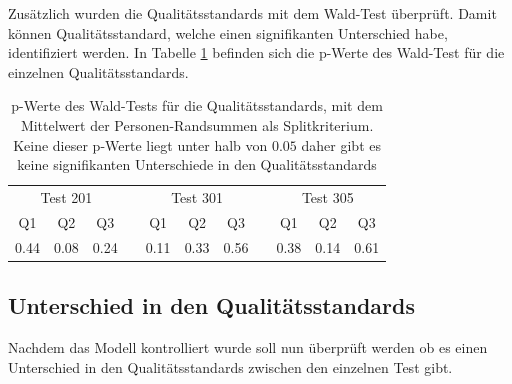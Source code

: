 Zusätzlich wurden die Qualitätsstandards mit dem Wald-Test überprüft. Damit können Qualitätsstandard, welche einen signifikanten Unterschied habe, identifiziert werden. In Tabelle \ref{tab:WaldTest} befinden sich die p-Werte des Wald-Test für die einzelnen Qualitätsstandards.

\begin{table}[htbp]
  \centering
\begin{tabular}{ccccccccccc}
\toprule
 \multicolumn{3}{c}{Test 201} &&  \multicolumn{3}{c}{Test 301}&&  \multicolumn{3}{c}{Test 305}\\ 
 Q1 & Q2 & Q3 && Q1 & Q2 & Q3 && Q1 & Q2 & Q3  \\ 
\midrule
  0.44 & 0.08 & 0.24 && 0.11 & 0.33 & 0.56 && 0.38 & 0.14 & 0.61   \\ 

\bottomrule
\end{tabular} 
  \caption{p-Werte des Wald-Tests für die Qualitätsstandards, mit dem Mittelwert der Personen-Randsummen als Splitkriterium. Keine dieser p-Werte liegt unter halb von $0.05$ daher gibt es keine signifikanten Unterschiede in den Qualitätsstandards }
  \label{tab:WaldTest}
\end{table}


\subsection{Unterschied in den Qualitätsstandards}

Nachdem das Modell kontrolliert wurde soll nun überprüft werden ob es einen Unterschied in den Qualitätsstandards zwischen den einzelnen Test gibt.


